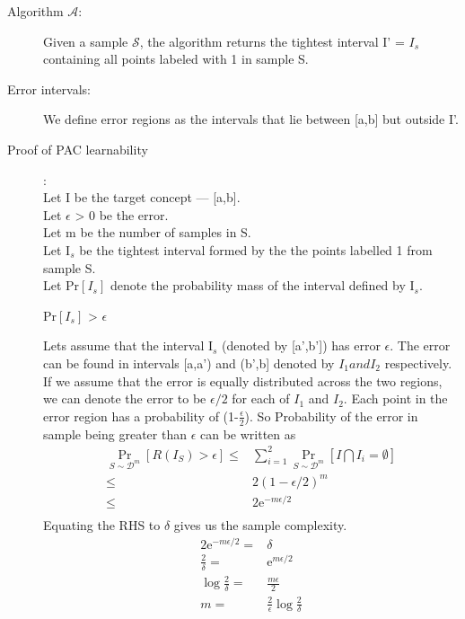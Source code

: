 \documentclass{article}
\begin{document}
\begin{description}
  \item[Algorithm \( \mathcal{A} \):] Given a sample \( \mathcal{S} \), the algorithm returns the tightest interval I' = \(I_{s}\) containing all points labeled with 1 in sample S.
  \item[Error intervals:] We define error regions as the intervals that lie between [a,b] but outside I'.
  \item[Proof of PAC learnability]:\\
    Let I be the target concept --- [a,b].\\
    Let \( \epsilon \) > 0 be the error.\\
    Let m be the number of samples in S.\\
    Let I\(_{s}\) be the tightest interval formed by the the points labelled 1 from sample S.\\
    Let Pr\([I_{s}]\) denote the probability mass of the interval defined by I\(_{s}\).\\
    \centerline{Pr\([I_{s}]\) > \( \epsilon \)}

    Lets assume that the interval I\(_{s}\) (denoted by [a',b']) has error \(\epsilon\).  The error can be found in intervals [a,a') and (b',b] denoted by \(I_{1} and I_{2} \) respectively.  If we assume that the error is equally distributed across the two regions, we can denote the error to be \(\epsilon/2\) for each of \(I_{1}\) and \(I_{2}\).  Each point in the error region has a probability of (1-\(\frac{\epsilon}{2}\)).  So Probability of the error in sample being greater than \(\epsilon \) can be written as
    \begin{align*}
      \underset{S\sim\mathcal{D}^{m}}{\Pr}[R(I_{S}) > \epsilon] \le & \sum_{i=1}^{2} \underset{S\sim\mathcal{D}^{m}}{\Pr} [{I  \bigcap I_{i} = \emptyset }]\\
      \le & {2( 1 - \epsilon/2)}^{m} \\
      \le & 2\mathrm{e}^{-m\epsilon/2}\\
    \end{align*}
    Equating the RHS to \( \delta \) gives us the sample complexity.
    \begin{align*}
      2\mathrm{e}^{-m\epsilon/2} = & \delta\\
      \frac{2}{\delta} = & \mathrm{e}^{m\epsilon/2} \\
      \log{\frac{2}{\delta}} = & \frac{m\epsilon}{2} \\
      m = & \frac{2}{\epsilon} \log{\frac{2}{\delta}}
    \end{align*}

\end{description}
\newpage
\end{document}
